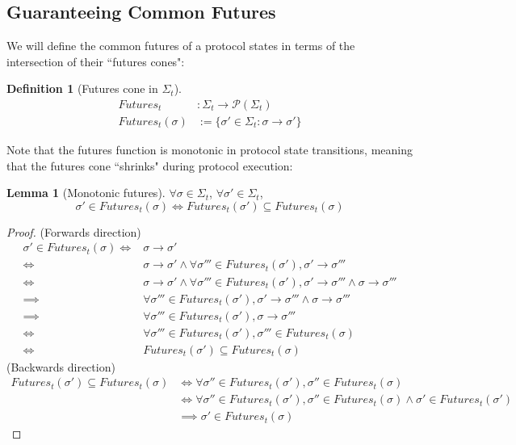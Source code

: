 \documentclass{article}
\theoremstyle{definition}
\newtheorem{lemma}{Lemma}
\newtheorem{defn}{Definition}[section]
\begin{document}
\subsection{Guaranteeing Common Futures}

We will define the common futures of a protocol states in terms of the intersection of their ``futures cones":

\begin{defn}[Futures cone in $\Sigma_t$]
\begin{align}
Futures_t&: \Sigma_t \to \mathcal{P}( \Sigma_t) \\
Futures_t(\sigma) &:= \{ \sigma' \in \Sigma_t : \sigma \to \sigma'  \}
\end{align}
\end{defn}

Note that the futures function is monotonic in protocol state transitions, meaning that the futures cone ``shrinks" during protocol execution:

\begin{lemma}[Monotonic futures]
$\forall \sigma \in \Sigma_t$, $\forall \sigma' \in \Sigma_t$,
$$
\sigma' \in Futures_t(\sigma) \iff Futures_t(\sigma') \subseteq Futures_t(\sigma)
$$
\end{lemma}

\begin{proof}
(Forwards direction)
\begin{align}
\sigma' \in Futures_t(\sigma)\iff &\sigma \to \sigma' \\
\iff &\sigma \to \sigma' \land \forall \sigma''' \in Futures_t(\sigma'), \sigma' \to \sigma''' \\
\iff &\sigma \to \sigma' \land \forall \sigma''' \in Futures_t(\sigma'), \sigma' \to \sigma''' \land \sigma \to \sigma''' \\
\implies &\forall \sigma''' \in Futures_t(\sigma'), \sigma' \to \sigma''' \land \sigma \to \sigma''' \\
\implies &\forall \sigma''' \in Futures_t(\sigma'), \sigma \to \sigma''' \\
\iff &\forall \sigma''' \in Futures_t(\sigma'), \sigma''' \in Futures_t(\sigma) \\
\iff &Futures_t(\sigma') \subseteq Futures_t(\sigma)
\end{align}
(Backwards direction)
\begin{align}
Futures_t(\sigma') \subseteq Futures_t(\sigma) &\iff \forall \sigma'' \in Futures_t(\sigma'), \sigma'' \in Futures_t(\sigma)\\
&\iff \forall \sigma'' \in Futures_t(\sigma'), \sigma'' \in Futures_t(\sigma) \land \sigma' \in Futures_t(\sigma')\\
&\implies \sigma' \in Futures_t(\sigma)
\end{align}
\end{proof}
\end{document}
